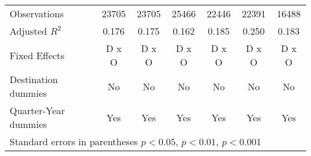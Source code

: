 \begin{table}[htbp]
\begin{tabular}{l*{6}{c}}
\hline
Observations        &       23705         &       23705         &       25466         &       22446         &       22391         &       16488         \\
Adjusted \(R^{2}\)  &       0.176         &       0.175         &       0.162         &       0.185         &       0.250         &       0.183         \\
Fixed Effects       &       D x O         &       D x O         &       D x O         &       D x O         &       D x O         &       D x O         \\
Destination dummies &          No         &          No         &          No         &          No         &          No         &          No         \\
Quarter-Year dummies&         Yes         &         Yes         &         Yes         &         Yes         &         Yes         &         Yes         \\
\hline\hline
\multicolumn{7}{l}{ Standard errors in parentheses \sym{*} \(p<0.05\), \sym{**} \(p<0.01\), \sym{***} \(p<0.001\)}\\
\end{tabular}
\end{table}
